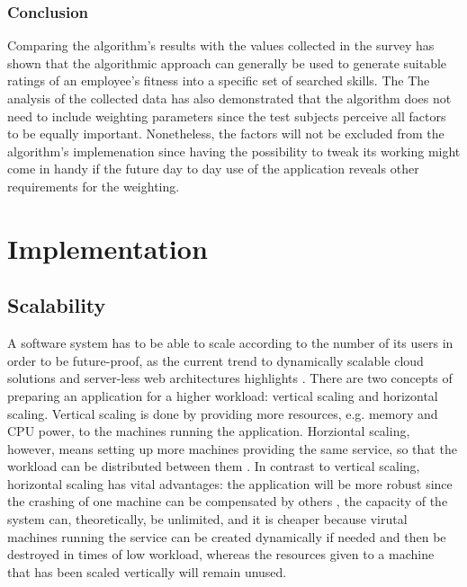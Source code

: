 \subsubsection{Conclusion}
Comparing the algorithm's results with the values collected in the survey has shown that the algorithmic approach can generally be used to generate
suitable ratings of an employee's fitness into a specific set of searched skills.
The
The analysis of the collected data has also demonstrated that the algorithm
does not need to include weighting parameters since the test subjects perceive all factors to be equally important. Nonetheless, the factors will not be excluded from the algorithm's implemenation since having the possibility to tweak its working might come in handy if the future day to day use of the application reveals other requirements for the weighting.

\newpage
\section{Implementation}
\subsection{Scalability}
\label{scale}
A software system has to be able to scale according to the number of its users in order to be future-proof, as the current trend to dynamically scalable cloud solutions and server-less web architectures highlights \cite{allthecloud}. There are two concepts of preparing an application for a higher workload: vertical scaling and horizontal scaling. Vertical scaling is done by providing more resources, e.g. memory and CPU power, to the machines running the application. Horziontal scaling, however, means setting up more machines providing the same service, so that the workload can be distributed between them \cite{hvscale}. In contrast to vertical scaling, horizontal scaling has vital advantages: the application will be more robust since the crashing of one machine can be compensated by others \cite{fedi}, the capacity of the system can, theoretically, be unlimited, and it is cheaper because virutal machines running the service can be created dynamically if needed and then be destroyed in times of low workload, whereas the resources given to a machine that has been scaled vertically will remain unused.

